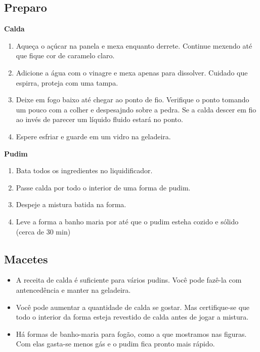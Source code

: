 \subsection{Preparo}
\textbf{Calda}
\begin{enumerate}
\item Aqueça o açúcar na panela e mexa enquanto derrete. Continue mexendo até que fique cor de caramelo claro.
\item Adicione a água com o vinagre e mexa apenas para dissolver. Cuidado que espirra, proteja com uma tampa.
\item Deixe em fogo baixo até chegar ao ponto de fio. Verifique o ponto tomando um pouco com a colher e despesajndo sobre a pedra. Se a calda descer em fio ao invés de parecer um líquido fluido estará no ponto.
\item Espere esfriar e guarde em um vidro na geladeira.
\end{enumerate}
\textbf{Pudim}
\begin{enumerate}
\item Bata todos os ingredientes no liquidificador.
\item Passe calda por todo o interior de uma forma de pudim.
\item Despeje a mistura batida na forma.
\item Leve a forma a banho maria por até que o pudim esteha cozido e sólido (cerca de 30 min)
\end{enumerate}
\subsection{Macetes}
\begin{itemize}
\item A receita de calda é suficiente para vários pudins. Você pode fazê-la com antencedência e manter na geladeira.
\item Você pode aumentar a quantidade de calda se gostar. Mas certifique-se que todo o interior da forma esteja revestido de calda antes de jogar a mistura.
\item Há formas de banho-maria para fogão, como a que mostramos nas figuras. Com elas gasta-se menos gás e o pudim fica pronto mais rápido.
\end{itemize}




  
  